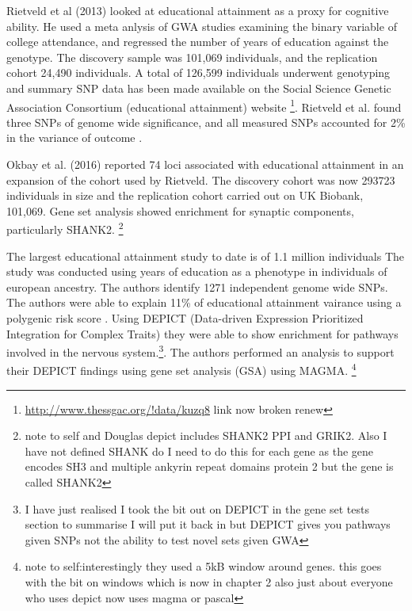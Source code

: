 Rietveld et al (2013) \cite{rietveld2013gwas} looked at educational attainment as a proxy for cognitive ability. He used a meta anlysis of GWA studies examining the binary variable of college attendance, and regressed the number of years of education against the genotype. The discovery sample was 101,069 individuals, and the replication cohort 24,490 individuals. A total of 126,599 individuals underwent genotyping and summary SNP data has been made available on the Social Science Genetic Association Consortium (educational attainment) website \footnote{\url{http://www.thessgac.org/!data/kuzq8} link now broken renew}. Rietveld et al. found three SNPs of genome wide significance, and all measured SNPs accounted for 2\% in the variance of outcome \cite{rietveld2013gwas}.

Okbay et al. (2016) \cite{okbay2016genome} reported 74 loci associated with educational attainment in an expansion of the cohort used by Rietveld\cite{rietveld2013gwas}. The discovery cohort was now 293723 individuals in size and the replication cohort carried out on UK Biobank, 101,069. Gene set analysis showed enrichment for synaptic components, particularly SHANK2. \footnote{note to self and Douglas depict includes SHANK2 PPI and GRIK2. Also I have not defined SHANK do I need to do this for each gene as the gene encodes SH3 and multiple ankyrin repeat domains protein 2 but the gene is called SHANK2}

The largest educational attainment study to date is of 1.1 million individuals \cite{lee2018gene} The study was conducted using years of education as a phenotype in individuals of european ancestry. The authors identify 1271 independent genome wide SNPs. The authors were able to explain 11\% of educational attainment vairance using a polygenic risk score \cite{lee2018gene} . Using DEPICT (Data-driven Expression Prioritized Integration for Complex Traits) they were able to show enrichment for pathways involved in the nervous system.\cite{pers2015biological}\footnote{I have just realised I took the bit out on DEPICT in the gene set tests section to summarise I will put it back in but DEPICT gives you pathways given SNPs not the ability to test novel sets given GWA}. The authors performed an analysis to support their DEPICT findings using gene set analysis (GSA) using MAGMA. \footnote{note to self:interestingly they used a 5kB window around genes.  this goes with the bit on windows which is now in chapter 2 also just about everyone who uses depict now uses magma or pascal}



